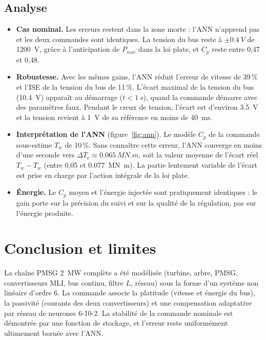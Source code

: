 \documentclass[11pt,a4paper]{article}
\theoremstyle{remark}
\begin{document}
\subsection{Analyse}
\begin{itemize}
  \item \textbf{Cas nominal.} Les erreurs restent dans la zone morte : l'ANN n'apprend pas et les
        deux commandes sont identiques. La tension du bus reste à $\pm\SI{0,4}{V}$ de
        \SI{1200}{V}, grâce à l'anticipation de $P_{msc}$ dans la loi plate, et $C_p$ reste entre
        0,47 et 0,48.
  \item \textbf{Robustesse.} Avec les mêmes gains, l'ANN réduit l'erreur de vitesse de 39\,\% et
        l'ISE de la tension du bus de 11\,\%. L'écart maximal de la tension du bus (\SI{10,4}{V})
        apparaît au démarrage ($t<\SI{1}{s}$), quand la commande démarre avec des paramètres faux.
        Pendant le creux de tension, l'écart est d'environ \SI{3,5}{V} et la tension revient à
        \SI{1}{V} de sa référence en moins de \SI{40}{ms}.
  \item \textbf{Interprétation de l'ANN} (figure~\ref{fig:ann}). Le modèle $C_p$ de la commande
        sous-estime $T_w$ de 10\,\%. Sans connaître cette erreur, l'ANN converge en moins d'une seconde
        vers $\Delta T_e\approx\SI{0,065}{MN.m}$, soit la valeur moyenne de l'écart réel
        $T_w-\hat T_w$ (entre 0,05 et \SI{0,077}{MN.m}). La partie lentement variable de l'écart est
        prise en charge par l'action intégrale de la loi plate.
  \item \textbf{Énergie.} Le $C_p$ moyen et l'énergie injectée sont pratiquement identiques : le
        gain porte sur la précision du suivi et sur la qualité de la régulation, pas sur l'énergie
        produite.
\end{itemize}

\section{Conclusion et limites}
La chaîne PMSG \SI{2}{MW} complète a été modélisée (turbine, arbre, PMSG, convertisseurs MLI, bus
continu, filtre $L$, réseau) sous la forme d'un système non linéaire d'ordre 6. La commande associe
la platitude (vitesse et énergie du bus), la passivité (courants des deux convertisseurs) et une
compensation adaptative par réseau de neurones 6-10-2. La stabilité de la commande nominale est
démontrée par une fonction de stockage, et l'erreur reste uniformément ultimement bornée avec l'ANN.
\end{document}
